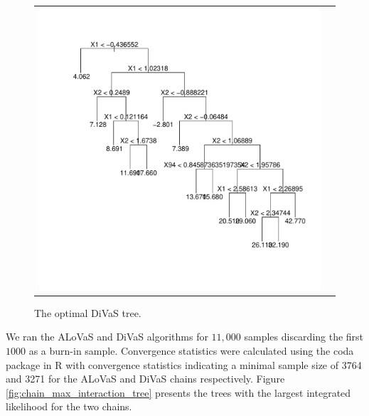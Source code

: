 \begin{figure}
\begin{center} 
\begin{tabular}{cc}
\includegraphics[scale=0.5]{figures/divas_tree_alovas_divas_compare.pdf}
\end{tabular}
\caption{The optimal DiVaS tree.}
\label{fig:interaction_trees}
\end{center}
\end{figure} 

We ran the ALoVaS and DiVaS algorithms for $11,000$ samples discarding the first $1000$ as a burn-in sample. Convergence statistics were calculated using the coda package in R with convergence statistics indicating a minimal sample size of 3764 and 3271 for the ALoVaS and DiVaS chains respectively. Figure \ref{fig:chain_max_interaction_tree} presents the trees with the largest integrated likelihood for the two chains.  

